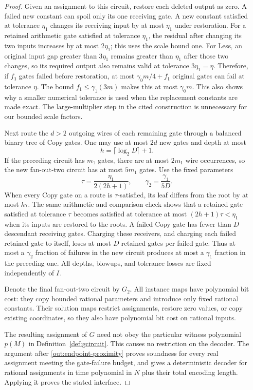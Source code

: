 \begin{proof}
Given an assignment to this circuit, restore each deleted output as
zero. A failed new constant can spoil only its one receiving gate. A
new constant satisfied at tolerance $\eta_1$ changes its receiving
input by at most $\eta_1$ under restoration. For a retained arithmetic
gate satisfied at tolerance $\eta_1$, the residual after changing its
two inputs increases by at most $2\eta_1$; this uses the scale bound
one. For Less, an original input gap greater than $3\eta_1$ remains
greater than $\eta_1$ after those two changes, so its required output
also remains valid at tolerance $3\eta_1=\eta$. Therefore, if $f_1$
gates failed before restoration, at most
$\gamma_0m/4+f_1$ original gates can fail at tolerance $\eta$.
The bound $f_1\leq\gamma_1(3m)$ makes this at most $\gamma_0m$.
This also shows why a smaller numerical tolerance is used when the
replacement constants are made exact. The large-multiplier step in
the cited construction is unnecessary for our bounded scale factors.

Next route the $d>2$ outgoing wires of each remaining gate through
a balanced binary tree of Copy gates. One may use at most $2d$ new
gates and depth at most
\[
 h=\lceil\log_2 D\rceil+1.
\]
If the preceding circuit has $m_1$ gates, there are at most $2m_1$
wire occurrences, so the new fan-out-two circuit has at most $5m_1$
gates. Use the fixed parameters
\[
 \tau=\frac{\eta_1}{2(2h+1)},\qquad
 \gamma_2=\frac{\gamma_1}{5D}.
\]
When every Copy gate on a route is $\tau$-satisfied, its leaf differs
from the root by at most $h\tau$. The same arithmetic and comparison
check shows that a retained gate satisfied at tolerance $\tau$
becomes satisfied at tolerance at most $(2h+1)\tau<\eta_1$ when its
inputs are restored to the roots. A failed Copy gate has fewer than
$D$ descendant receiving gates. Charging these receivers, and charging
each failed retained gate to itself, loses at most $D$ retained gates
per failed gate. Thus at most a $\gamma_2$ fraction of failures in
the new circuit produces at most a $\gamma_1$ fraction in the preceding
one. All depths, blowups, and tolerance losses are fixed independently
of $I$.

Denote the final fan-out-two circuit by $G_2$. All instance maps have
polynomial bit cost: they copy bounded rational parameters and introduce
only fixed rational constants. Their solution maps restrict assignments,
restore zero values, or copy existing coordinates, so they also have
polynomial bit cost on rational inputs.

The resulting assignment of $G$ need not obey the particular witness
polynomial $p(M)$ in Definition~\ref{def:gcircuit}. This causes no
restriction on the decoder. The argument after
\eqref{out:endpoint-proximity} proves soundness for every real assignment
meeting the gate-failure budget, and gives a deterministic decoder for
rational assignments in time polynomial in $N$ plus their total encoding
length. Applying it proves the stated interface.
\end{proof}

